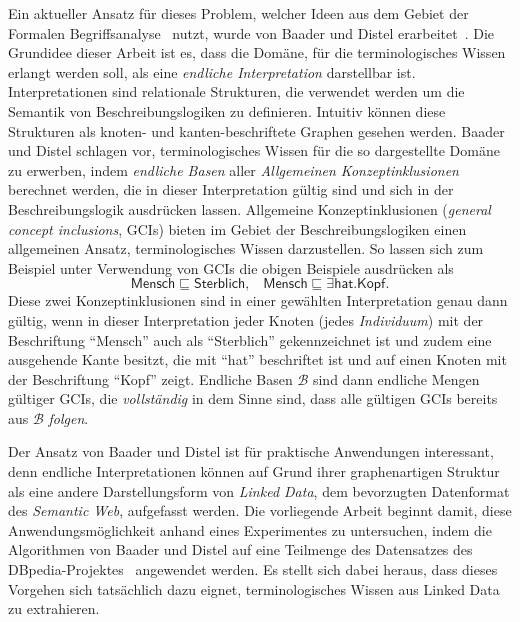 \documentclass[ngerman,fleqn,DIV=12]{scrartcl}
\begin{document}
Ein aktueller Ansatz für dieses Problem, welcher Ideen aus dem Gebiet der Formalen
Begriffsanalyse~\cite{fca-book} nutzt, wurde von Baader und Distel
erarbeitet~\cite{Diss-Felix}.  Die Grundidee dieser Arbeit ist es, dass die Domäne, für
die terminologisches Wissen erlangt werden soll, als eine \emph{endliche Interpretation}
darstellbar ist.  Interpretationen sind relationale Strukturen, die verwendet werden um
die Semantik von Beschreibungslogiken zu definieren.  Intuitiv können diese Strukturen als
knoten- und kanten-beschriftete Graphen gesehen werden.  Baader und Distel schlagen vor,
terminologisches Wissen für die so dargestellte Domäne zu erwerben, indem \emph{endliche
  Basen} aller \emph{Allgemeinen Konzeptinklusionen} berechnet werden, die in dieser
Interpretation gültig sind und sich in der Beschreibungslogik \ELbot ausdrücken lassen.
Allgemeine Konzeptinklusionen (\emph{general concept inclusions}, GCIs) bieten im Gebiet
der Beschreibungslogiken einen allgemeinen Ansatz, terminologisches Wissen darzustellen.
So lassen sich zum Beispiel unter Verwendung von GCIs die obigen Beispiele ausdrücken als
\begin{equation*}
  \mathsf{Mensch} \sqsubseteq \mathsf{Sterblich}, \;\;\; \mathsf{Mensch} \sqsubseteq \exists
  \mathsf{hat}. \mathsf{Kopf}.
\end{equation*}
Diese zwei Konzeptinklusionen sind in einer gewählten Interpretation genau dann gültig,
wenn in dieser Interpretation jeder Knoten (jedes \emph{Individuum}) mit der Beschriftung
\enquote{\textsf{Mensch}} auch als \enquote{\textsf{Sterblich}} gekennzeichnet ist und
zudem eine ausgehende Kante besitzt, die mit \enquote{\textsf{hat}} beschriftet ist und
auf einen Knoten mit der Beschriftung \enquote{\textsf{Kopf}} zeigt.  Endliche Basen
$\mathcal{B}$ sind dann endliche Mengen gültiger GCIs, die \emph{vollständig} in dem Sinne
sind, dass alle gültigen GCIs bereits aus $\mathcal{B}$ \emph{folgen}.

Der Ansatz von Baader und Distel ist für praktische Anwendungen interessant, denn endliche
Interpretationen können auf Grund ihrer graphenartigen Struktur als eine andere
Darstellungsform von \emph{Linked Data}, dem bevorzugten Datenformat des \emph{Semantic
  Web}, aufgefasst werden.  Die vorliegende Arbeit beginnt damit, diese
Anwendungsmöglichkeit anhand eines Experimentes zu untersuchen, indem die Algorithmen von
Baader und Distel auf eine Teilmenge des Datensatzes des DBpedia-Projektes~\cite{DBpedia}
angewendet werden.  Es stellt sich dabei heraus, dass dieses Vorgehen sich tatsächlich
dazu eignet, terminologisches Wissen aus Linked Data zu extrahieren.
\end{document}
